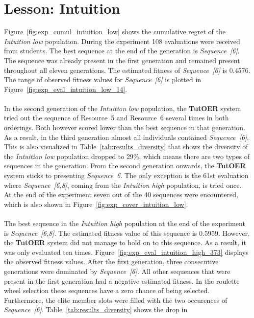 \section{Lesson: Intuition}
\label{sec:results_intuition}
Figure~\ref{fig:exp_cumul_intuition_low} shows the cumulative regret of the
\emph{Intuition low} population. During the experiment 108 evaluations were
received from students. The best sequence at the end of the generation is
\emph{Sequence~[6]}. The sequence was already present in the first generation
and remained present throughout all eleven generations. The estimated fitness of
\emph{Sequence~[6]} is 0.4576. The range of observed fitness values for
\emph{Sequence~[6]} is plotted in Figure~\ref{fig:exp_eval_intuition_low_14}.
\\\\
\noindent
In the second generation of the \emph{Intuition low} population, the
\textbf{TutOER} system tried out the sequence of Resource~5 and Resource~6
several times in both orderings. Both however scored lower than the best
sequence in that generation. As a result, in the third generation almost all
individuals contained \emph{Sequence~[6]}. This is also visualized in
Table~\ref{tab:results_diversity} that shows the diversity of the
\emph{Intuition low} population dropped to 29\%, which means there are two
types of sequences in the generation. From the second generation onwards, the
\textbf{TutOER} system sticks to presenting \emph{Sequence~6}. The only exception
is the 61st evaluation where \emph{Sequence~[6,8]}, coming from the
\emph{Intuition high} population, is tried once. At the end of the experiment
seven out of the 40 sequences were encountered, which is also shown in
Figure~\ref{fig:exp_cover_intuition_low}.\\\\
\noindent
The best sequence in the \emph{Intuition high}
population at the end of the experiment is \emph{Sequence~[6,8]}. The estimated
fitness value of this sequence is 0.5959. However, the \textbf{TutOER} system did
not manage to hold on to this sequence. As a result, it was only evaluated ten
times. Figure~\ref{fig:exp_eval_intuition_high_373} displays the observed
fitness values. After the first generation, three consecutive generations were
dominated by \emph{Sequence~[6]}. All other sequences that were present in the
first generation had a negative estimated fitness. In the roulette wheel
selection these sequences have a zero chance of being selected. Furthermore,
the elite member slots were filled with the two occurences of
\emph{Sequence~[6]}. Table~\ref{tab:results_diversity} shows the drop in
